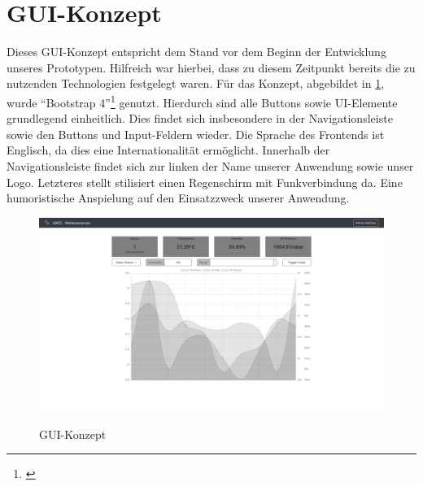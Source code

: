 

\section{GUI-Konzept}\label{GUI-Konzept}

Dieses GUI-Konzept entspricht dem Stand vor dem Beginn der Entwicklung unseres Prototypen.
Hilfreich war hierbei, dass zu diesem Zeitpunkt bereits die zu nutzenden Technologien festgelegt waren.
Für das Konzept, abgebildet in \cref{fig:gui-konzept}, wurde \enquote{Bootstrap 4}\footnote{\cite{bootstrap}} genutzt.
Hierdurch sind alle Buttons sowie UI-Elemente grundlegend einheitlich.
Dies findet sich insbesondere in der Navigationsleiste sowie den Buttons und Input-Feldern wieder.
Die Sprache des Frontends ist Englisch, da dies eine Internationalität ermöglicht.
Innerhalb der Navigationsleiste findet sich zur linken der Name unserer Anwendung sowie unser Logo.
Letzteres stellt stilisiert einen Regenschirm mit Funkverbindung da.
Eine humoristische Anspielung auf den Einsatzzweck unserer Anwendung.

\begin{figure}[h!!]
    \centering
    \begin{minipage}[t]{1\textwidth}
        \caption{GUI-Konzept}
        \includegraphics[width=1\textwidth]{img/gui-konzept.png}\\
        \label{fig:gui-konzept}
    \end{minipage}
\end{figure}

